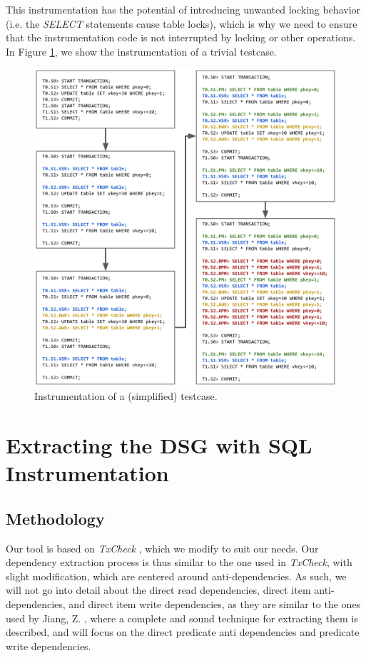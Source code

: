 This instrumentation has the potential of introducing unwanted locking behavior (i.e. the \textit{SELECT} statements cause table locks), which is why we need to ensure that the instrumentation code is not interrupted by locking or other operations. In Figure \ref{fig:sql_instrumentation_sample}, we show the instrumentation of a trivial testcase.

\begin{figure}[!h]
    \centering
    \includegraphics[width=\linewidth]{assets/sql_instrumentation_sample.png}
    \caption{Instrumentation of a (simplified) testcase.}
    \label{fig:sql_instrumentation_sample}
\end{figure}



\section{Extracting the DSG with SQL Instrumentation}

\subsection{Methodology}

Our tool is based on \textit{TxCheck} \cite{jiang2023detecting}, which we modify to suit our needs. Our dependency extraction process is thus similar to the one used in \textit{TxCheck}, with slight modification, which are centered around anti-dependencies. As such, we will not go into detail about the direct read dependencies, direct item anti-dependencies, and direct item write dependencies, as they are similar to the ones used by Jiang, Z. \cite{jiang2023detecting}, where a complete and sound technique for extracting them is described, and will focus on the direct predicate anti dependencies and predicate write dependencies.

